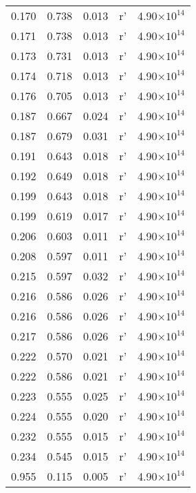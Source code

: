 \documentclass{aa}
\begin{document}
{\begin{longtable}{c|c|c|c|c}
  0.170 &   0.738 &  0.013 & r'        &  4.90$\times 10^{14}$    \\
  0.171 &   0.738 &  0.013 & r'        &  4.90$\times 10^{14}$    \\
  0.173 &   0.731 &  0.013 & r'        &  4.90$\times 10^{14}$    \\
  0.174 &   0.718 &  0.013 & r'        &  4.90$\times 10^{14}$    \\
  0.176 &   0.705 &  0.013 & r'        &  4.90$\times 10^{14}$    \\
  0.187 &   0.667 &  0.024 & r'        &  4.90$\times 10^{14}$    \\
  0.187 &   0.679 &  0.031 & r'        &  4.90$\times 10^{14}$    \\
  0.191 &   0.643 &  0.018 & r'        &  4.90$\times 10^{14}$    \\
  0.192 &   0.649 &  0.018 & r'        &  4.90$\times 10^{14}$    \\
  0.199 &   0.643 &  0.018 & r'        &  4.90$\times 10^{14}$    \\
  0.199 &   0.619 &  0.017 & r'        &  4.90$\times 10^{14}$    \\
  0.206 &   0.603 &  0.011 & r'        &  4.90$\times 10^{14}$    \\
  0.208 &   0.597 &  0.011 & r'        &  4.90$\times 10^{14}$    \\
  0.215 &   0.597 &  0.032 & r'        &  4.90$\times 10^{14}$    \\
  0.216 &   0.586 &  0.026 & r'        &  4.90$\times 10^{14}$    \\
  0.216 &   0.586 &  0.026 & r'        &  4.90$\times 10^{14}$    \\
  0.217 &   0.586 &  0.026 & r'        &  4.90$\times 10^{14}$    \\
  0.222 &   0.570 &  0.021 & r'        &  4.90$\times 10^{14}$    \\
  0.222 &   0.586 &  0.021 & r'        &  4.90$\times 10^{14}$    \\
  0.223 &   0.555 &  0.025 & r'        &  4.90$\times 10^{14}$    \\
  0.224 &   0.555 &  0.020 & r'        &  4.90$\times 10^{14}$    \\
  0.232 &   0.555 &  0.015 & r'        &  4.90$\times 10^{14}$    \\
  0.234 &   0.545 &  0.015 & r'        &  4.90$\times 10^{14}$    \\
  0.955 &   0.115 &  0.005 & r'        &  4.90$\times 10^{14}$    \\

\end{longtable}}
\end{document}
